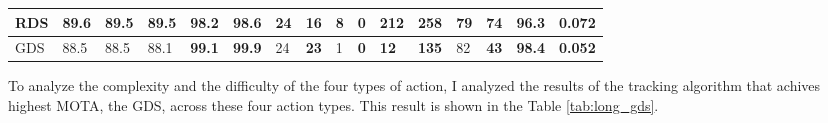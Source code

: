 \begin{table}[]
{\begin{tabular}{|l|l|l|l|l|l|l|l|l|l|l|l|l|l|l|l|}
			RDS    & \textbf{89.6} & \textbf{89.5} & \textbf{89.5} & 98.2                                                   & 98.6                                                   & 24   & 16                                                   & 8                                                    & \textbf{0}                                           & 212                                                  & 258                                                  & 79                                                    & 74                                                   & 96.3          & 0.072          \\ \hline
			GDS    & 88.5          & 88.5          & 88.1          & \textbf{99.1}                                          & \textbf{99.9}                                          & 24   & \textbf{23}                                          & 1                                                    & \textbf{0}                                           & \textbf{12}                                          & \textbf{135}                                         & 82                                                    & \textbf{43}                                          & \textbf{98.4} & \textbf{0.052} \\ \hline
		\end{tabular}%
	}
\end{table}
To analyze the complexity and the difficulty of the four types of action, I analyzed the results of the tracking algorithm that achives highest MOTA, the GDS, across these four action types. This result is shown in the Table \ref{tab:long_gds}.
